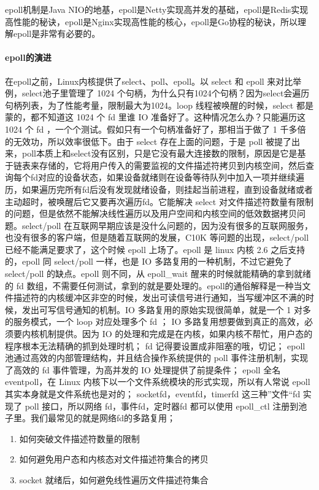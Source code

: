 \documentclass[../../../interview-questions.tex]{subfiles}
\begin{document}
epoll机制是Java NIO的地基，epoll是Netty实现高并发的基础，epoll是Redis实现高性能的秘诀，epoll是Nginx实现高性能的核心，epoll是Go协程的秘诀，所以理解epoll是非常有必要的。

\paragraph{epoll的演进}

在epoll之前，Linux内核提供了select、poll、epoll。以 select 和 epoll 来对比举例，select池子里管理了 1024 个句柄，为什么只有1024个句柄？因为select会遍历句柄列表，为了性能考量，限制最大为1024。loop 线程被唤醒的时候，select 都是蒙的，都不知道这 1024 个 fd 里谁 IO 准备好了。这种情况怎么办？只能遍历这 1024 个 fd ，一个个测试。假如只有一个句柄准备好了，那相当于做了 1 千多倍的无效功，所以效率很低下。由于 select 存在上面的问题，于是 poll 被提了出来，poll本质上和select没有区别，只是它没有最大连接数的限制，原因是它是基于链表来存储的，它将用户传入的需要监视的文件描述符拷贝到内核空间，然后查询每个fd对应的设备状态，如果设备就绪则在设备等待队列中加入一项并继续遍历，如果遍历完所有fd后没有发现就绪设备，则挂起当前进程，直到设备就绪或者主动超时，被唤醒后它又要再次遍历fd。它能解决 select 对文件描述符数量有限制的问题，但是依然不能解决线性遍历以及用户空间和内核空间的低效数据拷贝问题。select/poll 在互联网早期应该是没什么问题的，因为没有很多的互联网服务，也没有很多的客户端，但是随着互联网的发展，C10K 等问题的出现，select/poll 已经不能满足要求了，这个时候 epoll 上场了。epoll 是 linux 内核 2.6 之后支持的，epoll 同 select/poll 一样，也是 IO 多路复用的一种机制，不过它避免了 select/poll 的缺点。epoll 则不同，从 epoll\_wait 醒来的时候就能精确的拿到就绪的 fd 数组，不需要任何测试，拿到的就是要处理的。epoll的通俗解释是一种当文件描述符的内核缓冲区非空的时候，发出可读信号进行通知，当写缓冲区不满的时候，发出可写信号通知的机制。IO 多路复用的原始实现很简单，就是一个 1 对多的服务模式，一个 loop 对应处理多个 fd ；
IO 多路复用想要做到真正的高效，必须要内核机制提供。因为 IO 的处理和完成是在内核，如果内核不帮忙，用户态的程序根本无法精确的抓到处理时机；
fd 记得要设置成非阻塞的哦，切记；
epoll 池通过高效的内部管理结构，并且结合操作系统提供的 poll 事件注册机制，实现了高效的 fd 事件管理，为高并发的 IO 处理提供了前提条件；
epoll 全名 eventpoll，在 Linux 内核下以一个文件系统模块的形式实现，所以有人常说 epoll 其实本身就是文件系统也是对的；
socketfd，eventfd，timerfd 这三种”文件“fd 实现了 poll 接口，所以网络 fd，事件fd，定时器fd 都可以使用 epoll\_ctl 注册到池子里。我们最常见的就是网络fd的多路复用；

\begin{enumerate}
    \item {如何突破文件描述符数量的限制}
    \item {如何避免用户态和内核态对文件描述符集合的拷贝}
    \item {socket 就绪后，如何避免线性遍历文件描述符集合}
\end{enumerate}
\end{document}
